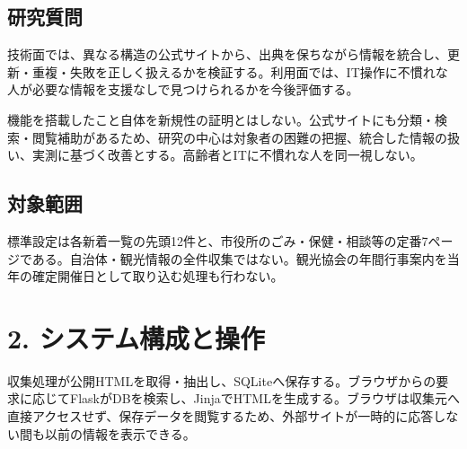 \documentclass[a4paper,10pt]{ltjsarticle}
\begin{document}
\subsection*{研究質問}

技術面では、異なる構造の公式サイトから、出典を保ちながら情報を統合し、更新・重複・失敗を正しく扱えるかを検証する。利用面では、IT操作に不慣れな人が必要な情報を支援なしで見つけられるかを今後評価する。


機能を搭載したこと自体を新規性の証明とはしない。公式サイトにも分類・検索・閲覧補助があるため、研究の中心は対象者の困難の把握、統合した情報の扱い、実測に基づく改善とする。高齢者とITに不慣れな人を同一視しない。


\subsection*{対象範囲}

標準設定は各新着一覧の先頭12件と、市役所のごみ・保健・相談等の定番7ページである。自治体・観光情報の全件収集ではない。観光協会の年間行事案内を当年の確定開催日として取り込む処理も行わない。


\clearpage

\section*{2. システム構成と操作}

収集処理が公開HTMLを取得・抽出し、SQLiteへ保存する。ブラウザからの要求に応じてFlaskがDBを検索し、JinjaでHTMLを生成する。ブラウザは収集元へ直接アクセスせず、保存データを閲覧するため、外部サイトが一時的に応答しない間も以前の情報を表示できる。
\end{document}

